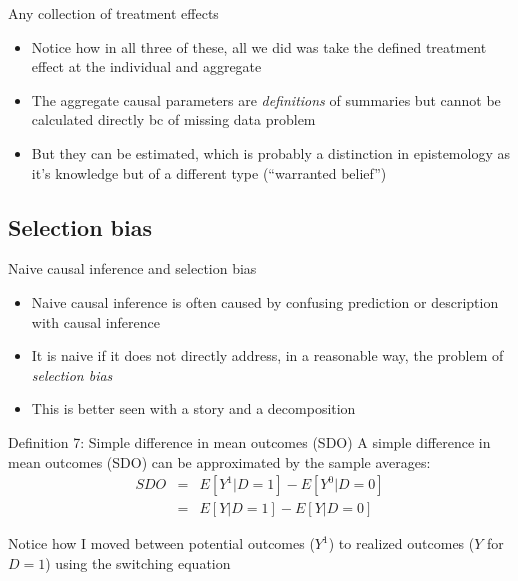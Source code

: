\documentclass{beamer}
\begin{document}
\begin{frame}{Any collection of treatment effects}

  \begin{itemize}
	\item Notice how in all three of these, all we did was take the defined treatment effect at the individual and aggregate
	\item The aggregate causal parameters are \emph{definitions} of summaries but cannot be calculated directly bc of missing data problem
	\item But they can be estimated, which is probably a distinction in epistemology as it's knowledge but of a different type (``warranted belief'')
  \end{itemize}

\end{frame}

\subsection{Selection bias}

\begin{frame}{Naive causal inference and selection bias}

  \begin{itemize}
    \item Naive causal inference is often caused by confusing prediction or description with causal inference
    \item It is naive if it does not directly address, in a reasonable way, the problem of \emph{selection bias}
    \item This is better seen with a story and a decomposition
  \end{itemize}

\end{frame}






\begin{frame}[plain]


  \begin{block}{Definition 7: Simple difference in mean outcomes (SDO)}
    A simple difference in mean outcomes (SDO) can be approximated by the sample averages:\begin{eqnarray*}
      SDO &=& E[Y^1 | D=1] - E[Y^0 | D=0] \\
      &=& E[Y | D=1] - E[Y | D=0]
    \end{eqnarray*}
  \end{block}
  \bigskip

Notice how I moved between potential outcomes ($Y^1$) to realized outcomes ($Y$ for $D=1$) using the switching equation

\end{frame}
\end{document}
